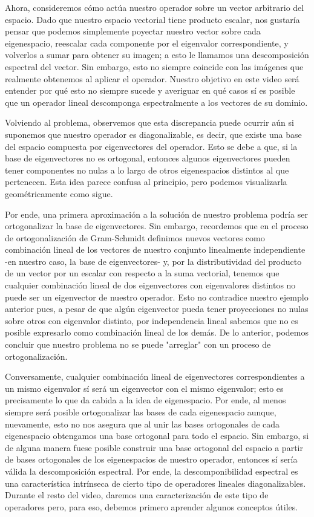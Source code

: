 \documentclass[12pt,dvipsnames]{article}
\numberwithin{equation}{section}
\begin{document}
Ahora, consideremos cómo actúa nuestro operador sobre un vector arbitrario del espacio. Dado que nuestro espacio vectorial tiene producto escalar, nos gustaría pensar que podemos simplemente poyectar nuestro vector sobre cada eigenespacio, reescalar cada componente por el eigenvalor correspondiente, y volverlos a sumar para obtener su imagen; a esto le llamamos una descomposición espectral del vector. Sin embargo, esto no siempre coincide con las imágenes que realmente obtenemos al aplicar el operador. Nuestro objetivo en este video será entender por qué esto no siempre sucede y averiguar en qué casos sí es posible que un operador lineal descomponga espectralmente a los vectores de su dominio.

Volviendo al problema, observemos que esta discrepancia puede ocurrir aún si suponemos que nuestro operador es diagonalizable, es decir, que existe una base del espacio compuesta por eigenvectores del operador. Esto se debe a que, si la base de eigenvectores no es ortogonal, entonces algunos eigenvectores pueden tener componentes no nulas a lo largo de otros eigenespacios distintos al que pertenecen. Esta idea parece confusa al principio, pero podemos visualizarla geométricamente como sigue.

Por ende, una primera aproximación a la solución de nuestro problema podría ser ortogonalizar la base de eigenvectores. Sin embargo, recordemos que en el proceso de ortogonalización de Gram-Schmidt definimos nuevos vectores como combinación lineal de los vectores de nuestro conjunto linealmente independiente -en nuestro caso, la base de eigenvectores- y, por la distributividad del producto de un vector por un escalar con respecto a la suma vectorial, tenemos que cualquier combinación lineal de dos eigenvectores con eigenvalores distintos no puede ser un eigenvector de nuestro operador. Esto no contradice nuestro ejemplo anterior pues, a pesar de que algún eigenvector pueda tener proyecciones no nulas sobre otros con eigenvalor distinto, por independencia lineal sabemos que no es posible expresarlo como combinación lineal de los demás. De lo anterior, podemos concluir que nuestro problema no se puede "arreglar" con un proceso de ortogonalización.

Conversamente, cualquier combinación lineal de eigenvectores correspondientes a un mismo eigenvalor sí será un eigenvector con el mismo eigenvalor; esto es precisamente lo que da cabida a la idea de eigenespacio. Por ende, al menos siempre será posible ortogonalizar las bases de cada eigenespacio aunque, nuevamente, esto no nos asegura que al unir las bases ortogonales de cada eigenespacio obtengamos una base ortogonal para todo el espacio. Sin embargo, si de alguna manera fuese posible construir una base ortogonal del espacio a partir de bases ortogonales de los eigenespacios de nuestro operador, entonces sí sería válida la descomposición espectral. Por ende, la descomponibilidad espectral es una característica intrínseca de cierto tipo de operadores lineales diagonalizables. Durante el resto del video, daremos una caracterización de este tipo de operadores pero, para eso, debemos primero aprender algunos conceptos útiles.
\end{document}
